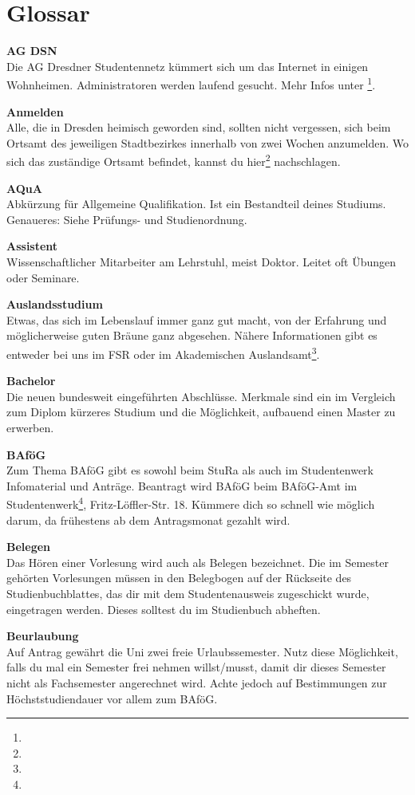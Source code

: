 \section{Glossar}

\textbf{AG DSN} \\
Die AG Dresdner Studentennetz kümmert sich um das Internet in einigen Wohnheimen.
Administratoren werden laufend gesucht.
Mehr Infos unter \footnote{}.

\textbf{Anmelden} \\
Alle, die in Dresden heimisch geworden sind, sollten nicht vergessen, sich beim Ortsamt des jeweiligen Stadtbezirkes innerhalb von zwei Wochen anzumelden.
Wo sich das zuständige Ortsamt befindet, kannst du hier\footnote{} nachschlagen.

\textbf{AQuA} \\
Abkürzung für Allgemeine Qualifikation.
Ist ein Bestandteil deines Studiums.
Genaueres:
Siehe Prüfungs- und Studienordnung.

\textbf{Assistent} \\
Wissenschaftlicher Mitarbeiter am Lehrstuhl, meist Doktor.
Leitet oft Übungen oder Seminare.

\textbf{Auslandsstudium} \\
Etwas, das sich im Lebenslauf immer ganz gut macht, von der Erfahrung und möglicherweise guten Bräune ganz abgesehen.
Nähere Informationen gibt es entweder bei uns im FSR oder im Akademischen Auslandsamt\footnote{}.

\textbf{Bachelor} \\
Die neuen bundesweit eingeführten Abschlüsse.
Merkmale sind ein im Vergleich zum Diplom kürzeres Studium und die Möglichkeit, aufbauend einen Master zu erwerben.

\textbf{BAföG} \\
Zum Thema BAföG gibt es sowohl beim StuRa als auch im Studentenwerk Infomaterial und Anträge.
Beantragt wird BAföG beim BAföG-Amt im Studentenwerk\footnote{}, Fritz-Löffler-Str. 18.
Kümmere dich so schnell wie möglich darum, da frühestens ab dem Antragsmonat gezahlt wird.

\textbf{Belegen} \\
Das Hören einer Vorlesung wird auch als Belegen bezeichnet.
Die im Semester gehörten Vorlesungen müssen in den Belegbogen auf der Rückseite des Studienbuchblattes, das dir mit dem Studentenausweis zugeschickt wurde, eingetragen werden.
Dieses solltest du im Studienbuch abheften.

\textbf{Beurlaubung} \\
Auf Antrag gewährt die Uni zwei freie Urlaubssemester.
Nutz diese Möglichkeit, falls du mal ein Semester frei nehmen willst/musst, damit dir dieses Semester nicht als Fachsemester angerechnet wird.
Achte jedoch auf Bestimmungen zur Höchststudiendauer vor allem zum BAföG.


